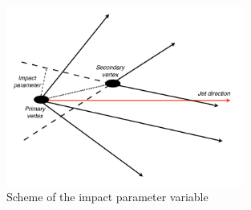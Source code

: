  \begin{figure}[h] 
 \label{Impact_parameter}
 \centering
 \caption{Scheme of the impact parameter variable}
 \includegraphics[width=0.7\textwidth]{./Capitulos/VariableDefinitions/Impact_parameter}  
 \end{figure} 

 
 
 
 
 
 
 
 
 
 
 
 
 
 
 
 
 
 
 
